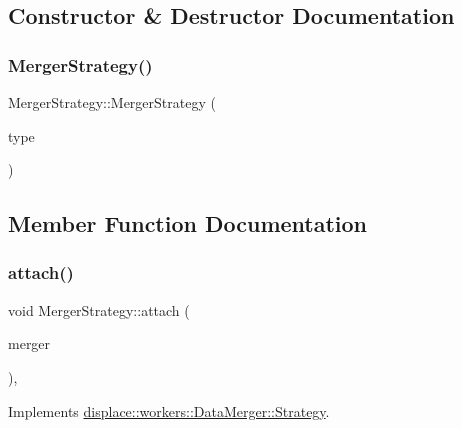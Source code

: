 \subsection{Constructor \& Destructor Documentation}
\mbox{\label{classdisplace_1_1workers_1_1_merger_strategy_a86148f0a283efde00c1b05ce39861c7d}} 
\subsubsection{\texorpdfstring{MergerStrategy()}{MergerStrategy()}}
{\footnotesize\ttfamily Merger\+Strategy\+::\+Merger\+Strategy (\begin{DoxyParamCaption}\item[{\mbox{\hyperlink{classdisplace_1_1workers_1_1_merger_strategy_a2836a7e3ec6a70b4a868057840d52915}{Merge\+Type}}}]{type }\end{DoxyParamCaption})}



\subsection{Member Function Documentation}
\mbox{\label{classdisplace_1_1workers_1_1_merger_strategy_addc43b70950fe76253fcfcf7975fc299}} 
\subsubsection{\texorpdfstring{attach()}{attach()}}
{\footnotesize\ttfamily void Merger\+Strategy\+::attach (\begin{DoxyParamCaption}\item[{\mbox{\hyperlink{classdisplace_1_1workers_1_1_data_merger}{Data\+Merger}} $\ast$}]{merger }\end{DoxyParamCaption})\hspace{0.3cm}{\ttfamily [override]}, {\ttfamily [virtual]}}



Implements \mbox{\hyperlink{classdisplace_1_1workers_1_1_data_merger_1_1_strategy_a00af0dfbcdec7b2c65a2533b261fdfd1}{displace\+::workers\+::\+Data\+Merger\+::\+Strategy}}.

